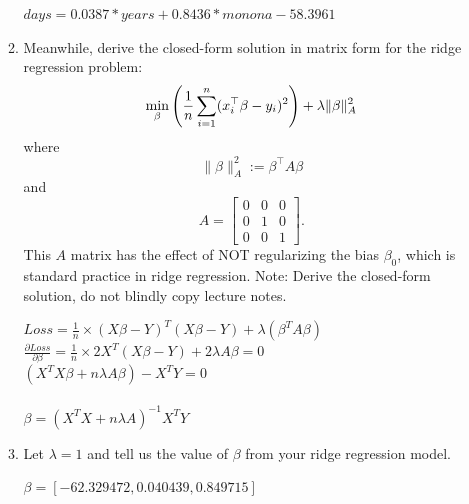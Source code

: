 \documentclass[a4paper]{article}
\theoremstyle{definition}
\newenvironment{soln}{
    \leavevmode\color{blue}\ignorespaces
}{}
\begin{document}
\begin{enumerate}
\begin{enumerate}
\begin{soln}
$days = 0.0387 * years + 0.8436 * monona -58.3961$
\end{soln}
\item
Meanwhile, derive the closed-form solution in matrix form for the ridge regression problem:
$$\min_\beta \left({1\over n} \sum_{i=1}^n (x_i^\top \beta - y_i)^2 \right) + \lambda \|\beta\|_A^2$$
where 
$$\|\beta\|_A^2 := \beta^\top A \beta$$
and
$$A=
\begin{bmatrix}
0 & 0 & 0 \\
0 & 1 & 0 \\
0 & 0 & 1
\end{bmatrix}.$$
This $A$ matrix has the effect of NOT regularizing the bias $\beta_0$, which is standard practice in ridge regression.
Note: Derive the closed-form solution, do not blindly copy lecture notes.

\begin{soln}
$Loss = \frac{1}{n} \times(X\beta - Y)^T(X\beta - Y) + \lambda (\beta^T A \beta) $\\
$\frac{\partial Loss}{\partial \beta} =\frac{1}{n} \times 2X^T(X\beta - Y)+2 \lambda A\beta = 0$\\
$(X^TX\beta +n\lambda A \beta) - X^TY = 0$\\\\
$ \beta = (X^TX +n\lambda A)^{-1}X^TY$
\end{soln}
\item
Let $\lambda=1$ and tell us the value of $\beta$ from your ridge regression model.

\begin{soln}
$\beta = [-62.329472, 0.040439, 0.849715]$
\end{soln}

\end{enumerate}

\end{enumerate}
\end{document}
